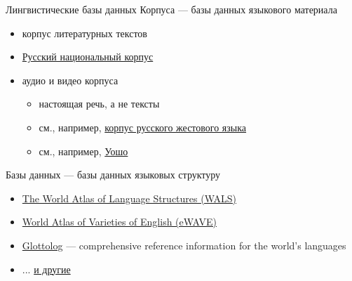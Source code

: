 \documentclass[13pt, t]{beamer}
\begin{document}
\begin{frame}{Лингвистические базы данных}
\alert{\large Корпуса --- базы данных языкового материала}
\begin{itemize}
\item корпус литературных текстов
\item \href{http://ruscorpora.ru/}{\color{colorblue} Русский национальный корпус}
\item аудио и видео корпуса \pause
\begin{itemize}
\item настоящая речь, а не тексты
\item см., например, \href{http://rsl.nstu.ru}{\color{colorblue} корпус русского жестового языка}
\item см., например, \href{https://www.youtube.com/watch?v=OUwOvF7TqgA&feature=youtu.be&t=1m25s}{\color{colorblue} Уошо}
\end{itemize}
\end{itemize}
\vfill
\alert{\large Базы данных --- базы данных языковых структуру}
\begin{itemize}
\item \href{https://wals.info/}{The World Atlas of Language Structures (WALS)}
\item \href{https://ewave-atlas.org/}{World Atlas of Varieties of English (eWAVE)}
\item \href{https://glottolog.org/}{Glottolog} --- comprehensive reference information for the world's languages
\item ... \href{https://clld.org/datasets.html}{и другие}
\end{itemize}
\end{frame}
\end{document}
